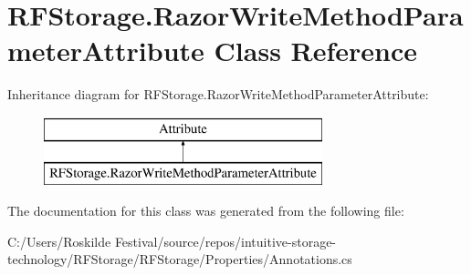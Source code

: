 \section{R\+F\+Storage.\+Razor\+Write\+Method\+Parameter\+Attribute Class Reference}
\label{class_r_f_storage_1_1_razor_write_method_parameter_attribute}
Inheritance diagram for R\+F\+Storage.\+Razor\+Write\+Method\+Parameter\+Attribute\+:\begin{figure}[H]
\begin{center}
\leavevmode
\includegraphics[height=2.000000cm]{class_r_f_storage_1_1_razor_write_method_parameter_attribute}
\end{center}
\end{figure}


The documentation for this class was generated from the following file\+:\begin{DoxyCompactItemize}
\item 
C\+:/\+Users/\+Roskilde Festival/source/repos/intuitive-\/storage-\/technology/\+R\+F\+Storage/\+R\+F\+Storage/\+Properties/Annotations.\+cs\end{DoxyCompactItemize}
